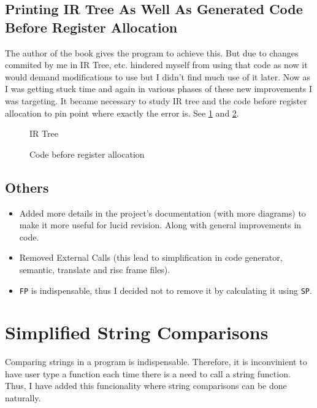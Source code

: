 \subsection{Printing IR Tree As Well As Generated Code Before Register Allocation}

The author of the book gives the program to achieve this. But due to changes commited by me in IR Tree, etc. hindered myself from using that code as now it would demand modifications to use but I didn't find much use of it later. Now as I was getting stuck time and again in various phases of these new improvements I was targeting. It became necessary to study IR tree and the code before register allocation to pin point where exactly the error is. See \ref{fig:ir} and \ref{fig:ba}.

\begin{figure}
	\centering
	\caption{IR Tree}
	\label{fig:ir}
\end{figure}


\begin{figure}
	\centering
	\caption{Code before register allocation}
	\label{fig:ba}
\end{figure}

\subsection{Others}

\begin{itemize}
	\item Added more details in the project’s documentation (with more diagrams) to make it more useful for lucid revision. Along with general improvements in code.
	\item Removed External Calls (this lead to simplification in code generator, semantic, translate and risc frame files).
	\item \texttt{FP} is indispensable, thus I decided not to remove it by calculating it using \texttt{SP}.
\end{itemize}

\section{Simplified String Comparisons}

Comparing strings in  a program is indispensable. Therefore, it is inconvinient to have user type a function each time there is a need to call a string function. Thus, I have added this funcionality where string comparisons can be done naturally.

